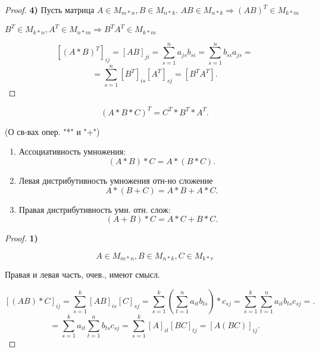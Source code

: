 \begin{proof}
\textbf{4)} Пусть матрица $A \in M_{m * n}, B \in M_{n * k}$. $AB \in M_{n * k} \Rightarrow (AB)^{T}\in M_{k * m}$ 

$B^{T} \in M_{k * n}, A^{T} \in M_{n * m} \Rightarrow B^{T}A^{T} \in M_{k * m}$ 

\[
    [(A * B)^{T}]_{ij} = [AB]_{ji} = \sum_{s = 1}^{n}a_{js}b_{si} = \sum_{s = 1}^{n}b_{si}a_{js} =
\] 
\[
    = \sum_{s = 1}^{n}[B^{T}]_{is}[A^{T}]_{sj} = [B^{T}A^{T}]
.\] 
\end{proof}

\[
    (A * B * C)^{T} = C^{T} * B^{T} * A^{T}
.\] 

\begin{theorem} (О св-вах опер. "*" и "+")
\begin{enumerate}
    \item Ассоциативность умножения:
        \[
            (A * B) * C = A * (B * C)
        .\] 
    \item Левая дистрибутивность умножения отн-но сложение
        \[
        A * (B + C) = A * B + A * C
        .\] 
    \item Правая дистрибутивность умн. отн. слож:
        \[
            (A + B) * C = A * C + B * C
        .\] 
\end{enumerate}

\end{theorem}

\begin{proof}
    \textbf{1)}
    
    \[
        A \in M_{m * n}, B \in M_{n * k}, C \in M_{k * r}
    \]

Правая и левая часть, очев., имеют смысл.

\[
[(AB) * C]_{ij} = \sum_{s = 1}^{k} [AB]_{is}[C]_{sj} = \sum_{s = 1}^{k} (\sum_{t = 1}^{n} a_{it}b_{ts}) * c_{sj} = \sum_{s = 1}^{k} \sum_{t = 1}^{n}  a_{it} b_{ts}c_{sj} = 
.\] 
\[
= \sum_{s = 1}^{k} a_{it} \sum_{t = 1}^{n} b_{ts}c_{sj} = \sum_{s = 1}^{k} [A]_{it}[BC]_{tj} = [A(BC)]_{ij}
.\] 
\end{proof}

